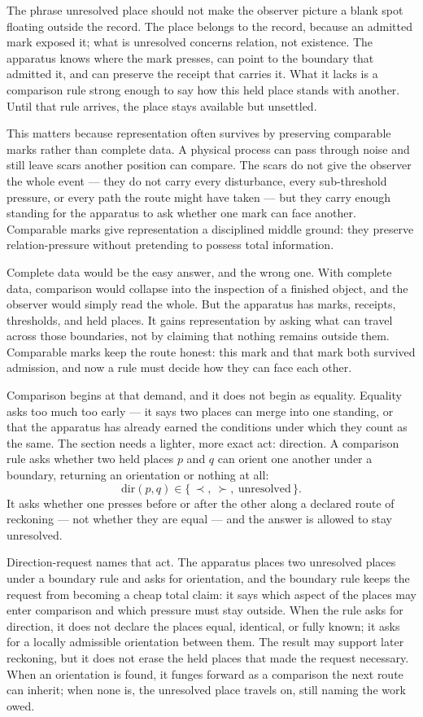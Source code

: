 The phrase unresolved place should not make the observer picture a blank spot floating outside the record. The place belongs to the record, because an admitted mark exposed it; what is unresolved concerns relation, not existence. The apparatus knows where the mark presses, can point to the boundary that admitted it, and can preserve the receipt that carries it. What it lacks is a comparison rule strong enough to say how this held place stands with another. Until that rule arrives, the place stays available but unsettled.

This matters because representation often survives by preserving comparable marks rather than complete data. A physical process can pass through noise and still leave scars another position can compare. The scars do not give the observer the whole event --- they do not carry every disturbance, every sub-threshold pressure, or every path the route might have taken --- but they carry enough standing for the apparatus to ask whether one mark can face another. Comparable marks give representation a disciplined middle ground: they preserve relation-pressure without pretending to possess total information.

Complete data would be the easy answer, and the wrong one. With complete data, comparison would collapse into the inspection of a finished object, and the observer would simply read the whole. But the apparatus has marks, receipts, thresholds, and held places. It gains representation by asking what can travel across those boundaries, not by claiming that nothing remains outside them. Comparable marks keep the route honest: this mark and that mark both survived admission, and now a rule must decide how they can face each other.

Comparison begins at that demand, and it does not begin as equality. Equality asks too much too early --- it says two places can merge into one standing, or that the apparatus has already earned the conditions under which they count as the same. The section needs a lighter, more exact act: direction. A comparison rule asks whether two held places $p$ and $q$ can orient one another under a boundary, returning an orientation or nothing at all:
\[ \mathrm{dir}(p, q) \in \{\,\prec,\ \succ,\ \text{unresolved}\,\}. \]
It asks whether one presses before or after the other along a declared route of reckoning --- not whether they are equal --- and the answer is allowed to stay unresolved.

Direction-request names that act. The apparatus places two unresolved places under a boundary rule and asks for orientation, and the boundary rule keeps the request from becoming a cheap total claim: it says which aspect of the places may enter comparison and which pressure must stay outside. When the rule asks for direction, it does not declare the places equal, identical, or fully known; it asks for a locally admissible orientation between them. The result may support later reckoning, but it does not erase the held places that made the request necessary. When an orientation is found, it funges forward as a comparison the next route can inherit; when none is, the unresolved place travels on, still naming the work owed.


